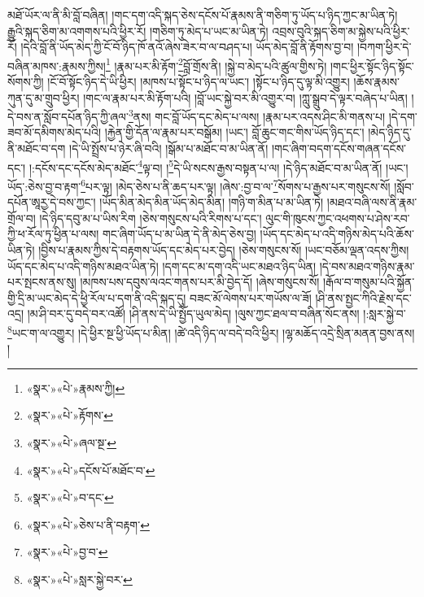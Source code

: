 མཐོ་ཡོར་ལ་ནི་མི་བློ་བཞིན། །གང་དག་འདི་སྐད་ཅེས་དངོས་པོ་རྣམས་ནི་གཅིག་ཏུ་ཡོད་པ་ཉིད་ཀྱང་མ་ཡིན་ཏེ། རྒྱུའི་སྐད་ཅིག་མ་འགགས་པའི་ཕྱིར་རོ། །གཅིག་ཏུ་མེད་པ་ཡང་མ་ཡིན་ཏེ། འབྲས་བུའི་སྐད་ཅིག་མ་སྐྱེས་པའི་ཕྱིར་རོ། །དེའི་བློ་ནི་ཡོད་མེད་ཀྱི་ངོ་བོ་ཉིད་ཁོ་ནའོ་ཞེས་ཟེར་བ་ལ་བཤད་པ། ཡོད་མེད་བློ་ནི་རྟོགས་བྱ་བ། །བཀག་ཕྱིར་དེ་བཞིན་མཁས་:རྣམས་ཀྱིས།\footnote{«སྣར་»«པེ་»རྣམས་ཀྱི།} །རྣམ་པར་མི་རྟོག་\footnote{«སྣར་»«པེ་»རྟོགས་}བློ་གྲོས་ནི། །སྐྱེ་བ་མེད་པའི་ཚུལ་གྱིས་ཏེ། །གང་ཕྱིར་སྟོང་ཉིད་སྟོང་སོགས་ཀྱི། །ངོ་བོ་སྟོང་ཉིད་དེ་ཡི་ཕྱིར། །མཁས་པ་སྟོང་པ་ཉིད་ལ་ཡང་། །སྟོང་པ་ཉིད་དུ་ལྟ་མི་འགྱུར། །ཆོས་རྣམས་ཀུན་དུ་མ་གྲུབ་ཕྱིར། །གང་ལ་རྣམ་པར་མི་རྟོག་པའི། །བློ་ཡང་སྐྱེ་བར་མི་འགྱུར་བ། །ཀླུ་སྒྲུབ་དེ་ལྟར་བཞེད་པ་ཡིན། །དེ་བས་ན་སློབ་དཔོན་ཉིད་ཀྱི་ཞལ་\footnote{«སྣར་»«པེ་»ཞལ་སྔ་}ནས། གང་བློ་ཡོད་དང་མེད་པ་ལས། །རྣམ་པར་འདས་ཤིང་མི་གནས་པ། །དེ་དག་ཟབ་མོ་དམིགས་མེད་པའི། །རྐྱེན་གྱི་དོན་ལ་རྣམ་པར་བསྒོམ། །ཡང་། བློ་ཆུང་གང་གིས་ཡོད་ཉིད་དང་། །མེད་ཉིད་དུ་ནི་མཐོང་བ་དག །དེ་ཡི་སྤྲོས་པ་ཉེར་ཞི་བའི། །སྒོམ་པ་མཐོང་བ་མ་ཡིན་ནོ། །གང་ཞིག་བདག་དངོས་གཞན་དངོས་དང་། །:དངོས་དང་དངོས་མེད་མཐོང་\footnote{«སྣར་»«པེ་»དངོས་པོ་མཐོང་བ་}ལྟ་བ། །\footnote{«སྣར་»«པེ་»བ་དང་}དེ་ཡི་སངས་རྒྱས་བསྟན་པ་ལ། །དེ་ཉིད་མཐོང་བ་མ་ཡིན་ནོ། །ཡང་། ཡོད་:ཅེས་བྱ་བ་རྟག་\footnote{«སྣར་»«པེ་»ཅེས་པ་ནི་བརྟག་}པར་ལྟ། །མེད་ཅེས་པ་ནི་ཆད་པར་ལྟ། །ཞེས་:བྱ་བ་ལ་\footnote{«སྣར་»«པེ་»བྱ་བ་}སོགས་པ་རྒྱས་པར་གསུངས་སོ། །སློབ་དཔོན་ཨཱརྱ་དེ་བས་ཀྱང་། །ཡོད་མིན་མེད་མིན་ཡོད་མེད་མིན། །གཉི་ག་མིན་པ་མ་ཡིན་ཏེ། །མཐའ་བཞི་ལས་ནི་རྣམ་གྲོལ་བ། །དེ་ཉིད་དབུ་མ་པ་ཡིས་རིག །ཅེས་གསུངས་པའི་རིགས་པ་དང་། ལུང་གི་ཁུངས་ཀྱང་འཕགས་པ་ཤེས་རབ་ཀྱི་ཕ་རོལ་ཏུ་ཕྱིན་པ་ལས། གང་ཞིག་ཡོད་པ་མ་ཡིན་དེ་ནི་མེད་ཅེས་བྱ། །ཡོད་དང་མེད་པ་འདི་གཉིས་མེད་པའི་ཆོས་ཡིན་ཏེ། །བྱིས་པ་རྣམས་ཀྱིས་དེ་བརྟགས་ཡོད་དང་མེད་པར་བྱེད། །ཅེས་གསུངས་སོ། །ཡང་བཅོམ་ལྡན་འདས་ཀྱིས། ཡོད་དང་མེད་པ་འདི་གཉིས་མཐའ་ཡིན་ཏེ། །དག་དང་མ་དག་འདི་ཡང་མཐའ་ཉིད་ཡིན། །དེ་བས་མཐའ་གཉིས་རྣམ་པར་སྤངས་ནས་སུ། །མཁས་པས་དབུས་ལའང་གནས་པར་མི་བྱེད་དོ། །ཞེས་གསུངས་སོ། །རྒོལ་བ་གསུམ་པའི་སྐྱོན་གྱི་དྲི་མ་ཡང་མེད་དེ་ཕྱི་རོལ་པ་དག་ནི་འདི་སྐད་དུ། བཟང་མོ་ལེགས་པར་གཡོས་ལ་ཟོ། །ཤི་ནས་སྤྱང་ཀིའི་རྗེས་དང་འདྲ། །མ་ཤི་བར་དུ་བདེ་བར་འཚོ། །ཤི་ནས་དེ་ཡི་སྤྱོད་ཡུལ་མེད། །ལུས་ཀྱང་ཐལ་བ་བཞིན་སོང་ནས། །:སླར་སྐྱེ་བ་\footnote{«སྣར་»«པེ་»སླར་སྐྱེ་བར་}ཡང་ག་ལ་འགྱུར། །དེ་ཕྱིར་སྔ་ཕྱི་ཡོད་པ་མིན། །ཚེ་འདི་ཉིད་ལ་བདེ་བའི་ཕྱིར། །ལྷ་མཆོད་འདྲེ་སྲིན་མནན་བྱས་ནས། །
